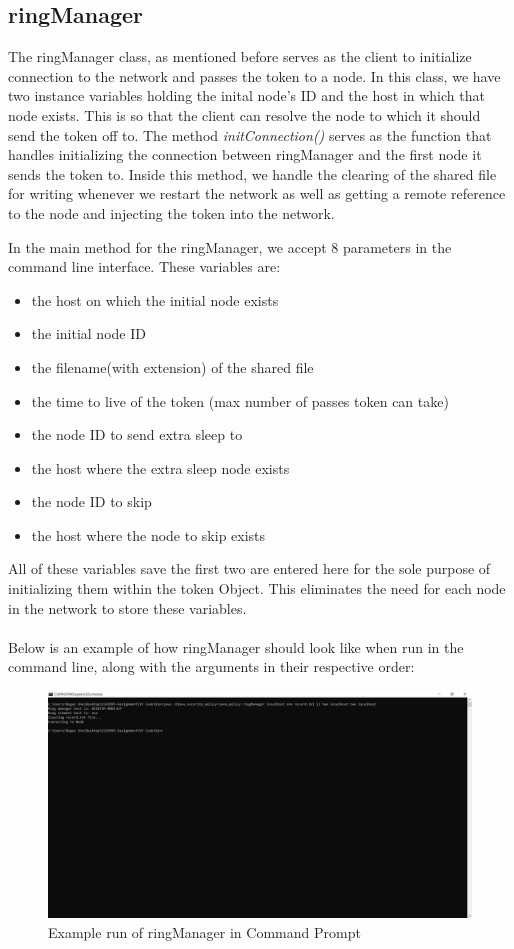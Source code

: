 \documentclass[11pt, a4paper]{article}
\begin{document}
\subsection{ringManager}

The ringManager class, as mentioned before serves as the client to initialize connection to the network and passes the token to a node. In this class, we have two instance variables holding the inital node's ID and the host in which that node exists. This is so that the client can resolve the node to which it should send the token off to. The method \textit{initConnection()} serves as the function that handles initializing the connection between ringManager and the first node it sends the token to. Inside this method, we handle the clearing of the shared file for writing whenever we restart the network as well as getting a remote reference to the node and injecting the token into the network.

In the main method for the ringManager, we accept 8 parameters in the command line interface. These variables are:
\begin{itemize}
\item the host on which the initial node exists
\item the initial node ID
\item the filename(with extension) of the shared file
\item the time to live of the token (max number of passes token can take)
\item the node ID to send extra sleep to
\item the host where the extra sleep node exists
\item the node ID to skip
\item the host where the node to skip exists
\end{itemize} 
All of these variables save the first two are entered here for the sole purpose of initializing them within the token Object. This eliminates the need for each node in the network to store these variables.\\\\
Below is an example of how ringManager should look like when run in the command line, along with the arguments in their respective order:
\begin{figure}[!h]
\centering
\includegraphics[scale=0.35]{ring_manager}
\caption{Example run of ringManager in Command Prompt}
\end{figure}
\end{document}
